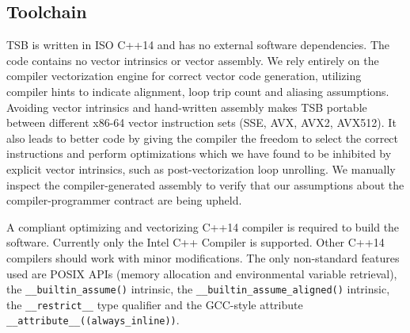 \documentclass{sig-alternate-05-2015}
\begin{document}
%

\subsection{Toolchain}
\label{sec:experimental_setup:toolchain}

TSB is written in ISO C++14 and has no external software dependencies. The code
contains no vector intrinsics or vector assembly. We rely entirely on the
compiler vectorization engine for correct vector code generation, utilizing
compiler hints to indicate alignment, loop trip count and aliasing assumptions.
Avoiding vector intrinsics and hand-written assembly makes TSB portable between
different x86-64 vector instruction sets (SSE, AVX, AVX2, AVX512). It also
leads to better code by giving the compiler the freedom to select the correct
instructions and perform optimizations which we have found to be inhibited by
explicit vector intrinsics, such as post-vectorization loop unrolling. We
manually inspect the compiler-generated assembly to verify that our assumptions
about the compiler-programmer contract are being upheld.

A compliant optimizing and vectorizing C++14 compiler is required to build the
software. Currently only the Intel C++ Compiler is supported. Other C++14
compilers should work with minor modifications. The only non-standard features
used are POSIX APIs (memory allocation and environmental variable retrieval),
the \lstinline{__builtin_assume()} intrinsic, the
\lstinline{__builtin_assume_aligned()} intrinsic, the \lstinline{__restrict__}
type qualifier and the GCC-style attribute
\lstinline{__attribute__((always_inline))}. 
\end{document}
